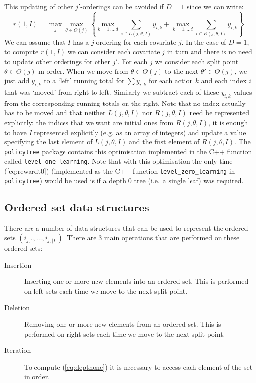 \documentclass{article}
\newcommand{\splitval}{\ensuremath{\theta}}
\newcommand{\splitvals}{\ensuremath{\Theta}}
\newcommand{\depth}{\ensuremath{D}}
\begin{document}
This updating of other $j'$-orderings can be avoided if $\depth = 1$
since we can write:
\begin{equation}
  \label{eq:depthone}
  r(1,I) = \max_{j}\max_{\splitval \in \splitvals(j)} \left\{ \max_{k=1,\dots d} \sum_{i \in
     L(j,\splitval,I) } y_{i,k} + \max_{k=1,\dots d} \sum_{i \in R(j,\splitval,I)} y_{i,k} \right\}
\end{equation}
We can assume that $I$ has a $j$-ordering for each covariate $j$.  In
the case of $D=1$, to
compute $r(1,I)$ we can consider each covariate $j$ in turn and there
is no need to update other orderings for other $j'$. For each $j$ we
consider each split point $\splitval \in \splitvals(j)$ in order. When
we move from $\splitval \in \splitvals(j)$ to the next
$\splitval' \in \splitvals(j)$, we just add $y_{i,k}$ to a `left'
running total for $\sum y_{i,k}$ for each action $k$ and each index
$i$ that was `moved' from right to left. Similarly we subtract each of
these $y_{i,k}$ values from the corresponding running totals on the
right. Note that no index actually
has to be moved and that neither $L(j,\splitval,I)$ nor
$R(j,\splitval,I)$ need be represented explicitly: the indices that we
want are initial ones from $R(j,\splitval,I)$, it is enough to have
$I$ represented explicitly (e.g. as an array of integers) and update
a value specifying the last element of $L(j,\splitval,I)$ and the
first element of $R(j,\splitval,I)$.   The \texttt{policytree} package
contains this optimisation implemented in the C++ function called
\verb+level_one_learning+. Note that with this optimisation the only
time (\ref{eq:rewardt0}) (implemented as the C++ function
\verb+level_zero_learning+ in \texttt{policytree}) would be used is if
a depth 0 tree (i.e.\ a single leaf) was required.

\subsection{Ordered set data structures}
\label{sec:orderedsets}

There are a number of data structures that can be used to represent
the ordered sets $(i_{j,1}, \dots, i_{j,|I|})$. There are 3 main
operations that are performed on these ordered sets:
\begin{description}
\item[Insertion] Inserting one or more new elements into an ordered
  set. This is performed on left-sets each time we move to the next
  split point.
\item[Deletion] Removing one or more new elements from an ordered
  set. This is performed on right-sets each time we move to the next
  split point.
\item[Iteration] To compute (\ref{eq:depthone}) it is necessary to
  access each element of the set in order.
\end{description}
\end{document}
